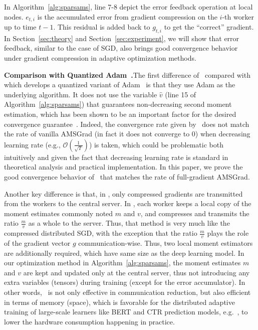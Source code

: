 \documentclass[11pt]{article}
\begin{document}
In Algorithm~\ref{alg:sparsams}, line 7-8 depict the error feedback operation at local nodes. $e_{t,i}$ is the accumulated error from gradient compression on the $i$-th worker up to time $t-1$. This residual is added back to $g_{t,i}$ to get the ``correct'' gradient. In Section~\ref{sec:theory} and Section~\ref{sec:experiment}, we will show that error feedback, similar to the case of SGD, also brings good convergence behavior under gradient compression in adaptive optimization methods.


\textbf{Comparison with Quantized Adam~\cite{chen2020quantized}.}\hspace{0.1in}The first difference of \algo\ compared with \citep{chen2020quantized} which develops a quantized variant of Adam~\cite{kingma2014adam} is that they use Adam as the underlying algorithm. It does not use the variable $\hat v$ (line 15 of Algorithm~\ref{alg:sparsams}) that guarantees non-decreasing second moment estimation, which has been shown to be an important factor for the desired convergence guarantee~\cite{reddi2019convergence,Proc:Chen_ICLR19}. Indeed, the convergence rate given by~\cite{chen2020quantized} does not match the rate of vanilla AMSGrad (in fact it does not converge to 0) when decreasing learning rate (e.g., $\mathcal O(\frac{1}{\sqrt T})$) is taken, which could be problematic both intuitively and given the fact that decreasing learning rate is standard in theoretical analysis and practical implementation. In this paper, we prove the good convergence behavior of \algo\ that matches the rate of full-gradient AMSGrad.


Another key difference is that, in \algo, only compressed gradients are transmitted from the workers to the central server. 
In \citep{chen2020quantized}, each worker keeps a local copy of the moment estimates commonly noted $m$ and $v$, and compresses and transmits the ratio $\frac{m}{v}$ as a whole to the server. 
Thus, that method is very much like the compressed distributed SGD, with the exception that the ratio $\frac{m}{v}$ plays the role of the gradient vector $g$ communication-wise. Thus, two local moment estimators are additionally required, which have same size as the deep learning model.
In our optimization method in Algorithm~\ref{alg:sparsams}, the moment estimates $m$ and $v$ are kept and updated only at the central server, thus not introducing any extra variables (tensors) during training (except for the error accumulator). In other words, \algo\ is not only effective in communication reduction, but also efficient in terms of memory (space), which is favorable for the distributed adaptive training of large-scale learners like BERT and CTR prediction models, e.g.~\cite{Proc:BERT,Proc:Zhao_MLsys20}, to lower the hardware consumption happening in practice.
\end{document}
